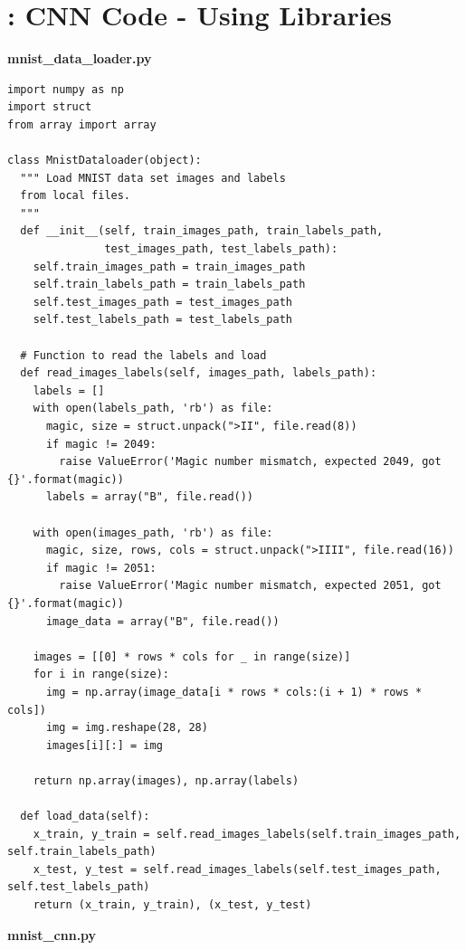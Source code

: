 \documentclass[a4paper]{article}
\begin{document}
\newpage
\section{\hspace{-5mm}: CNN Code - Using Libraries}
\label{section:cnn-code}
\textbf{mnist\_data\_loader.py}
\begin{lstlisting}[basicstyle= \scriptsize]
import numpy as np
import struct
from array import array

class MnistDataloader(object):
  """ Load MNIST data set images and labels
  from local files.
  """
  def __init__(self, train_images_path, train_labels_path, 
               test_images_path, test_labels_path):
    self.train_images_path = train_images_path
    self.train_labels_path = train_labels_path
    self.test_images_path = test_images_path
    self.test_labels_path = test_labels_path
  
  # Function to read the labels and load
  def read_images_labels(self, images_path, labels_path):        
    labels = []
    with open(labels_path, 'rb') as file:
      magic, size = struct.unpack(">II", file.read(8))
      if magic != 2049:
        raise ValueError('Magic number mismatch, expected 2049, got {}'.format(magic))
      labels = array("B", file.read())        
    
    with open(images_path, 'rb') as file:
      magic, size, rows, cols = struct.unpack(">IIII", file.read(16))
      if magic != 2051:
        raise ValueError('Magic number mismatch, expected 2051, got {}'.format(magic))
      image_data = array("B", file.read())        

    images = [[0] * rows * cols for _ in range(size)]
    for i in range(size):
      img = np.array(image_data[i * rows * cols:(i + 1) * rows * cols])
      img = img.reshape(28, 28)
      images[i][:] = img            
    
    return np.array(images), np.array(labels)
          
  def load_data(self):
    x_train, y_train = self.read_images_labels(self.train_images_path, self.train_labels_path)
    x_test, y_test = self.read_images_labels(self.test_images_path, self.test_labels_path)
    return (x_train, y_train), (x_test, y_test)
\end{lstlisting}
\textbf{mnist\_cnn.py}
\end{document}
